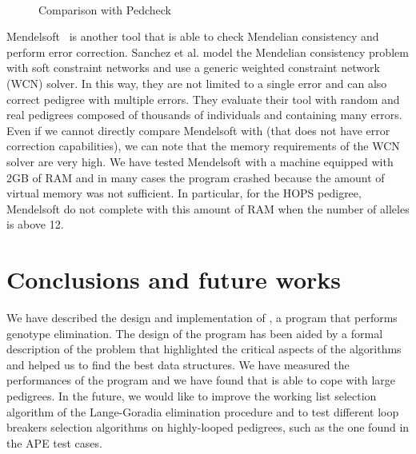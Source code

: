 \begin{figure}
  \centering
  \\
  \caption{Comparison with Pedcheck}
  \label{fig:pedcheckcfr}
\end{figure}


Mendelsoft~\cite{Sanchez2008} is another tool that is able to check Mendelian
consistency and perform error correction. Sanchez et al. model the Mendelian
consistency problem with soft constraint networks and use a generic weighted
constraint network (WCN) solver. In this way, they are not limited to a single error
and can also correct pedigree with multiple errors. They evaluate their tool
with random and real pedigrees composed of thousands of individuals and
containing many errors. Even if we cannot directly compare Mendelsoft with
{} (that does not have error correction capabilities), we can note
that the memory requirements of the WCN solver are very high. We have tested
Mendelsoft with a machine equipped with 2GB of RAM and in many cases the program
crashed because the amount of virtual memory was not sufficient. In particular,
for the HOPS pedigree, Mendelsoft do not complete with this amount of RAM when
the number of alleles is above 12.

\section{Conclusions and future works}
\label{sec:concl-future-works}

We have described the design and implementation of {}, a program that
performs genotype elimination. The design of the program has been aided by a
formal description of the problem that highlighted the critical aspects of the
algorithms and helped us to find the best data structures. We have measured the
performances of the program and we have found that {} is able to cope
with large pedigrees. In the future, we would like to improve the working list
selection algorithm of the Lange-Goradia elimination procedure and to test
different loop breakers selection algorithms on highly-looped pedigrees, such
as the one found in the APE test cases.





